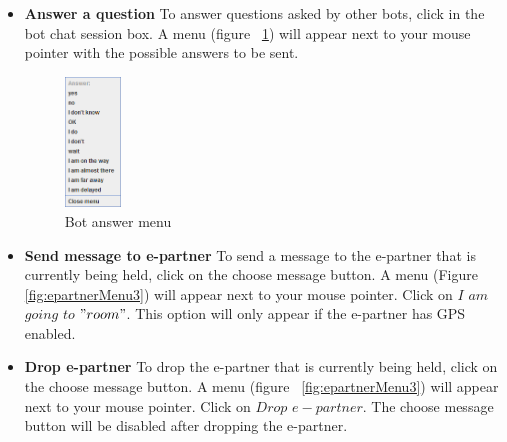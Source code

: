 \begin{itemize}
\item \textbf{Answer a question}
To answer questions asked by other bots, click in the bot chat session box. A menu (figure ~\ref{fig:answerBot}) will appear next to your mouse pointer with the possible answers to be sent.

\begin{figure}[h]
\begin{center}
\includegraphics[width=0.14\textwidth]{HumanPlayerGUI/hpg-bot-chat.png}
\end{center}
\caption{Bot answer menu}
\label{fig:answerBot}
\end{figure}

\item \textbf{Send message to e-partner}
To send a message to the e-partner that is currently being held, click on the choose message button. A menu (Figure  \ref{fig:epartnerMenu3}) will appear next to your mouse pointer. Click on $I$ $am$ $going$ $to$ $"room"$. This option will only appear if the e-partner has GPS enabled.

\item \textbf{Drop e-partner}
To drop the e-partner that is currently being held, click on the choose message button. A menu (figure  ~\ref{fig:epartnerMenu3}) will appear next to your mouse pointer. Click on $Drop$ $e-partner$. The choose message button will be disabled after dropping the e-partner.

\end{itemize}